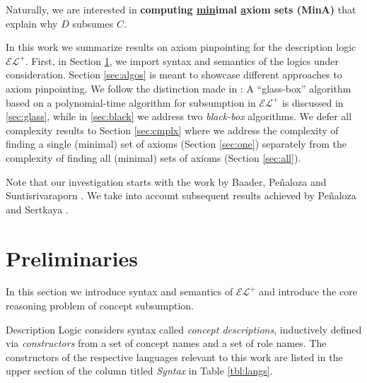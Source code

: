 \documentclass{llncs}
\newcommand{\elp}{\ensuremath{\mathcal{EL^+}}\xspace}
\begin{document}
Naturally, we are interested in \textbf{computing \underline{min}imal \underline{a}xiom sets (MinA)} that explain why $D$ subsumes $C$.

In this work we summarize results on axiom pinpointing for the description logic \elp. First, in Section \ref{sec:prelim}, we import syntax and semantics of the logics under consideration. Section \ref{sec:algos} is meant to showcase different approaches to axiom pinpointing. We follow the distinction made in \cite[Section 1]{family}: A \enquote{glass-box} algorithm based on a polynomial-time algorithm for subsumption in \elp is discussed in \ref{sec:glass}, while in \ref{sec:black} we address two \emph{black-box} algorithms. We defer all complexity results to Section \ref{sec:cmplx} where we address the complexity of finding a single (minimal) set of axioms (Section \ref{sec:one}) separately from the complexity of finding all (minimal) sets of axioms (Section \ref{sec:all}).

Note that our investigation starts with the work by Baader, Pe{\~{n}}aloza and Suntisrivaraporn \cite{orig1,orig2}. We take into account subsequent results achieved by Pe{\~{n}}aloza and Sertkaya \cite{hard,family}.

\section{Preliminaries}
\label{sec:prelim}

In this section we introduce syntax and semantics of \elp and introduce the core reasoning problem of concept subsumption.

Description Logic considers syntax called \emph{concept descriptions}, inductively defined via \emph{constructors} from a set of concept names and a set of role names. The constructors of the respective languages relevant to this work are listed in the upper section of the column titled \emph{Syntax} in Table \ref{tbl:langs}.
\end{document}
